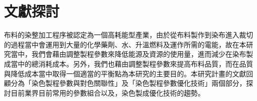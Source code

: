 \chapter{文獻探討}
\label{c:literat}
布料的染整加工程序被認定為一個高耗能型產業，由於從布料製作到染布進入裁切的過程當中會運用到大量的化學藥劑、水、升溫燃料及運作所需的電能，故在本研究當中，我們會藉由調整製程參數來降低能源及資源的使用量，進而減少在染布製成當中的總消耗成本。另外，我們也藉由調整製程參數來提高布料品質，而在品質與降低成本當中取得一個適當的平衡點為本研究的主要目的。本研究計畫的文獻回顧分為「染色製程參數與對色關聯性」及「染色製程參數優化技術」兩個部分，探討目前業界目前常用的參數組合以及，染色製成優化技術的趨勢。